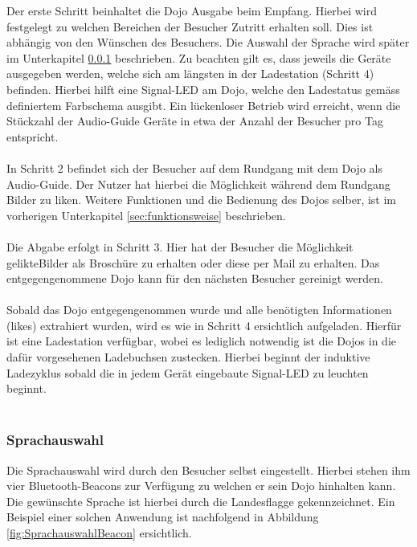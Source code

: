 Der erste Schritt beinhaltet die Dojo Ausgabe beim Empfang. Hierbei wird festgelegt zu welchen Bereichen der Besucher Zutritt erhalten soll. Dies ist abhängig von den Wünschen des Besuchers. Die Auswahl der Sprache wird später im Unterkapitel \ref{sec:sprachauswahl} beschrieben. Zu beachten gilt es, dass jeweils die Geräte ausgegeben werden, welche sich am längsten in der Ladestation (Schritt 4) befinden. Hierbei hilft eine Signal-LED am Dojo, welche den Ladestatus gemäss definiertem Farbschema ausgibt. Ein lückenloser Betrieb wird erreicht, wenn die Stückzahl der Audio-Guide Geräte in etwa der Anzahl der Besucher pro Tag entspricht.
\\
\\
In Schritt 2 befindet sich der Besucher auf dem Rundgang mit dem Dojo als Audio-Guide. Der Nutzer hat hierbei die Möglichkeit während dem Rundgang Bilder zu \glqq liken\grqq . Weitere Funktionen und die Bedienung des Dojos selber, ist im vorherigen Unterkapitel \ref{sec:funktionsweise} beschrieben.
\\
\\
Die Abgabe erfolgt in Schritt 3. Hier hat der Besucher die Möglichkeit \glqq gelikte\grqq Bilder als Broschüre zu erhalten oder diese per Mail zu erhalten. Das entgegengenommene Dojo kann für den nächsten Besucher gereinigt werden.
\\
\\
Sobald das Dojo entgegengenommen wurde und alle benötigten Informationen (\glqq likes\grqq) extrahiert wurden, wird es wie in Schritt 4 ersichtlich aufgeladen. Hierfür ist eine Ladestation verfügbar, wobei es lediglich notwendig ist die Dojos in die dafür vorgesehenen Ladebuchsen zustecken. Hierbei beginnt der induktive Ladezyklus sobald die in jedem Gerät eingebaute Signal-LED zu leuchten beginnt.
\\
\\
\subsubsection{Sprachauswahl} \label{sec:sprachauswahl}

Die Sprachauswahl wird durch den Besucher selbst eingestellt. Hierbei stehen ihm vier Bluetooth-Beacons zur Verfügung zu welchen er sein Dojo hinhalten kann. Die gewünschte Sprache ist hierbei durch die Landesflagge gekennzeichnet. Ein Beispiel einer solchen Anwendung ist nachfolgend in Abbildung \ref{fig:SprachauswahlBeacon} ersichtlich.

